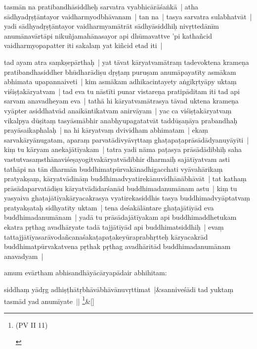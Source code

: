 \documentclass[article,12pt,a4paper]{memoir}
\begin{document}
	  \pstart tasmān na pratibandhāsiddheḥ sarvatra vyabhicārāśaṅkā | atha sādhyadṛṣṭāntayor vaidharmyodbhāvanam | tan na | tasya sarvatra sulabhatvāt | yadi sādhyadṛṣṭāntayor vaidharmyamātrāt sādhyāsiddhiḥ nivṛttedānīm anumānavārtāpi nikuñjamahānasayor api dhūmavattve 'pi kathañcid vaidharmyopapatter iti sakalaṃ yat kiñcid etad\label{sarit__ratnakīrtinibandhāvali__143038} iti |
	\pend
      

	  \pstart tad ayam atra saṃkṣepārthaḥ | yat tāvat kāryatvamātraṃ tadevoktena krameṇa pratibandhasiddher bhūdharādiṣu dṛṣṭaṃ puruṣam anumāpayatīty asmākam abhimata upapannaiveti | kim asmākam adhikacintayety aṅgīkṛtyāpy uktaṃ viśiṣṭakāryatvam | tad eva tu nāstīti punar vistareṇa pratipāditam iti tad api sarvam anavadheyam eva | tathā hi kāryatvamātrasya tāvad uktena krameṇa vyāpter asiddhatvād anaikāntikatvam anirvāyam | yac ca viśiṣṭakāryatvaṃ vikalpya dūṣitaṃ tasyāsmābhir anabhyupagatatvāt taddūṣaṇāya prabandhaḥ prayāsaikaphalaḥ | na hi kāryatvaṃ dvividham abhimatam | ekaṃ sarvakāryānugatam, aparaṃ parvatādivyāvṛttaṃ ghaṭapaṭaprāsādādyanuyāyīti | kiṃ tu kāryam anekajātīyakam | tatra yadi nāma paṭasya prāsādādibhiḥ saha vastutvasaṃsthānaviśeṣayogitvakāryatvādibhir dharmaiḥ sajātīyatvam asti tathāpi na tān dharmān buddhimatpūrvakānadhigacchati vyāvahārikaṃ pratyakṣaṃ, kāryatvādīnāṃ buddhimadvyatirekānuvidhānābhāvāt | tat kathaṃ prāsādaparvatādiṣu kāryatvādidarśanād buddhimadanumānam astu | kiṃ tu yasyaiva ghaṭajātīyakāryacakrasya vyatirekasiddhis tasya buddhimadvyāptatvaṃ pratyakṣataḥ sidhyatīty uktam | tena deśakālāntare ghaṭajātīyād eva buddhimadanumānam | yadā tu prāsādajātīyakam api buddhimaddhetukam ekatra pṛthag avadhāryate tadā tajjātīyād api buddhimatsiddhiḥ | evaṃ tattajjātīyasarāvodañcanaśakaṭapaṭakeyūraprabhṛtteḥ kāryacakrād buddhimatpūrvakatvena pṛthak pṛthag avadhāritād buddhimadanumānam anavadyam |
	\pend
      

	  \pstart amum evārtham abhisandhāyācāryapādair abhihitam:
	\pend
      
	    
	    \stanza[\smallbreak]
	siddhaṃ yādṛg adhiṣṭhātṛbhāvābhāvānuvṛttimat |&sanniveśādi tad yuktaṃ tasmād yad anumīyate || \footnote{\begin{english}(PV II 11)\end{english}}\&[\smallbreak]


	
\end{document}
